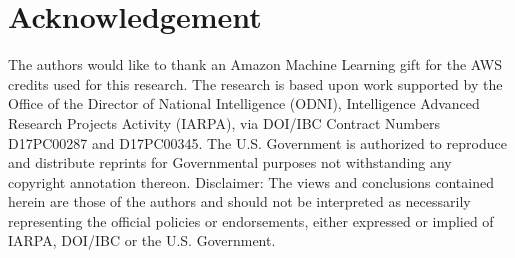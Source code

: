 \documentclass{article}
\begin{document}
\section{Acknowledgement}
The authors would like to thank an Amazon Machine Learning gift for the AWS credits used for this research. The research is based upon work supported by the Office of the Director of National Intelligence (ODNI), Intelligence Advanced Research Projects Activity (IARPA), via DOI/IBC Contract Numbers D17PC00287 and D17PC00345. The U.S. Government is authorized to reproduce and distribute reprints for Governmental purposes not withstanding any copyright annotation thereon. Disclaimer: The views and conclusions contained herein are those of the authors and should not be interpreted as necessarily representing the official policies or endorsements, either expressed or implied of IARPA, DOI/IBC or the U.S. Government.

\medskip
\small

\end{document}
